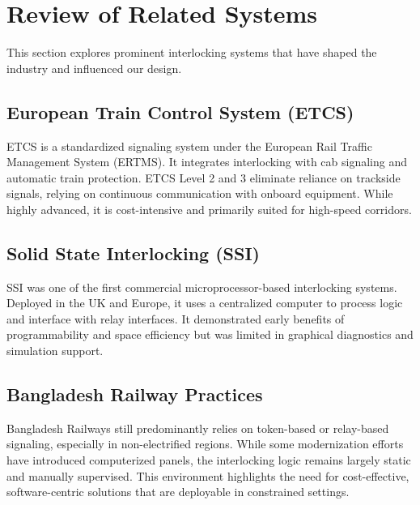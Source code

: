 \section{Review of Related Systems}
This section explores prominent interlocking systems that have shaped the industry and influenced our design.

\subsection{European Train Control System (ETCS)}
ETCS is a standardized signaling system under the European Rail Traffic Management System (ERTMS). It integrates interlocking with cab signaling and automatic train protection. ETCS Level 2 and 3 eliminate reliance on trackside signals, relying on continuous communication with onboard equipment. While highly advanced, it is cost-intensive and primarily suited for high-speed corridors.

\subsection{Solid State Interlocking (SSI)}
SSI was one of the first commercial microprocessor-based interlocking systems. Deployed in the UK and Europe, it uses a centralized computer to process logic and interface with relay interfaces. It demonstrated early benefits of programmability and space efficiency but was limited in graphical diagnostics and simulation support.

\subsection{Bangladesh Railway Practices}
Bangladesh Railways still predominantly relies on token-based or relay-based signaling, especially in non-electrified regions. While some modernization efforts have introduced computerized panels, the interlocking logic remains largely static and manually supervised. This environment highlights the need for cost-effective, software-centric solutions that are deployable in constrained settings.
